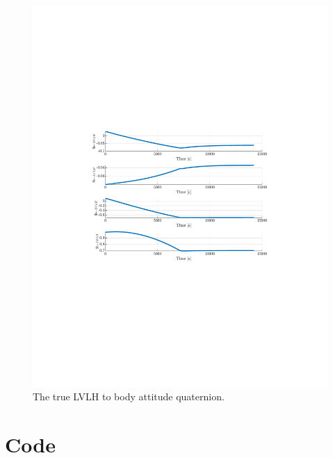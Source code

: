 \documentclass[]{article}
\begin{document}
\begin{figure}[!h]
	\centering
	\includegraphics[width=\linewidth,trim={4cm, 8cm, 4cm, 8cm},clip]{figs/P3Q5.pdf}
	\caption{The true LVLH to body attitude quaternion.}
	\label{fig:P3Q5}
\end{figure}

\section{Code}



\end{document}
